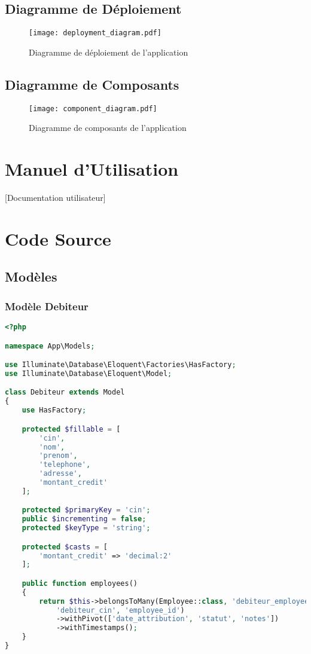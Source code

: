 \documentclass[12pt,a4paper]{report}
\begin{document}
\subsection{Diagramme de Déploiement}
\begin{figure}[H]
    \centering
    \texttt{[image: deployment\_diagram.pdf]}
    \caption{Diagramme de déploiement de l'application}
    \label{fig:deployment_diagram}
\end{figure}

\subsection{Diagramme de Composants}
\begin{figure}[H]
    \centering
    \texttt{[image: component\_diagram.pdf]}
    \caption{Diagramme de composants de l'application}
    \label{fig:component_diagram}
\end{figure}

\section{Manuel d'Utilisation}
[Documentation utilisateur]

\section{Code Source}
\subsection{Modèles}
\subsubsection{Modèle Debiteur}
\begin{lstlisting}[language=PHP]
<?php

namespace App\Models;

use Illuminate\Database\Eloquent\Factories\HasFactory;
use Illuminate\Database\Eloquent\Model;

class Debiteur extends Model
{
    use HasFactory;

    protected $fillable = [
        'cin',
        'nom',
        'prenom',
        'telephone',
        'adresse',
        'montant_credit'
    ];

    protected $primaryKey = 'cin';
    public $incrementing = false;
    protected $keyType = 'string';

    protected $casts = [
        'montant_credit' => 'decimal:2'
    ];

    public function employees()
    {
        return $this->belongsToMany(Employee::class, 'debiteur_employee', 
            'debiteur_cin', 'employee_id')
            ->withPivot(['date_attribution', 'statut', 'notes'])
            ->withTimestamps();
    }
}
\end{lstlisting}
\end{document}
